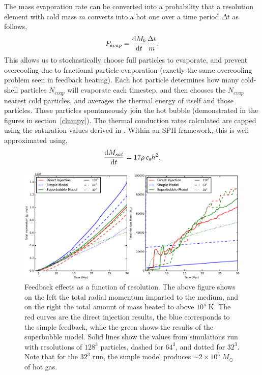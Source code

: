 The mass evaporation rate can be converted into a probability that a resolution
element with cold mass $m$ converts into a hot one over a time
period $\Delta t$ as follows, 
\begin{equation}\label{evaporation_probability}
    P_{evap} = \frac{{\rm d}M_b}{{\rm d}t} \frac{\Delta t}{m}.
\end{equation}
This allows us to stochastically choose full particles to evaporate, and prevent
overcooling due to fractional particle evaporation (exactly the same overcooling
problem seen in feedback heating).  Each hot particle determines how many
cold-shell particles $N_{evap}$ will evaporate each timestep, and then chooses
the $N_{evap}$ nearest cold particles, and averages the thermal energy of itself
and those particles.  These particles spontaneously join the hot bubble
(demonstrated in the figures in section~\ref{clumpy}).  The thermal conduction
rates calculated are capped using the saturation values derived in
\citet{Cowie1977}.  Within an SPH framework, this is well approximated using,
\begin{equation}\label{saturation_rate}
    \frac{{\rm d}M_{sat}}{{\rm d}t} = 17\rho\,c_{\rm s} h^2.
\end{equation}

\begin{figure}
    \includegraphics[width=\textwidth]{figures1/onestar_homogeneous.eps}
    \caption[Feedback effects as a function of resolution]{Feedback effects as a
    function of resolution.  The above figure shows on the left the total radial
    momentum imparted to the medium, and on the right the total amount of mass
    heated to above $10^5\;\mathrm{K}$.  The red curves are the direct injection
    results, the blue corresponds to the simple feedback, while the green shows
    the results of the superbubble model.  Solid lines show the values from
    simulations run with resolutions of $128^3$ particles, dashed for $64^3$,
    and dotted for $32^3$.  Note that for the $32^3$ run, the simple model
    produces $\sim 2\times 10^5\;M_\odot$ of hot gas.}
    \label{onestar_homogeneous}
\end{figure}

